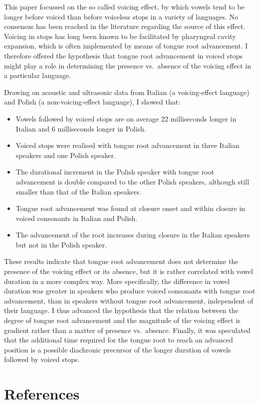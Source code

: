 \documentclass[authoryear, 5p]{elsarticle}
\providecommand{\tightlist}{%
  \setlength{\itemsep}{0pt}\setlength{\parskip}{0pt}}
\begin{document}
This paper focussed on the so called voicing effect, by which vowels
tend to be longer before voiced than before voiceless stops in a variety
of languages. No consensus has been reached in the literature regarding
the source of this effect. Voicing in stops has long been known to be
facilitated by pharyngeal cavity expansion, which is often implemented
by means of tongue root advancement. I therefore offered the hypothesis
that tongue root advancement in voiced stops might play a role in
determining the presence vs.~absence of the voicing effect in a
particular language.

Drawing on acoustic and ultrasonic data from Italian (a voicing-effect
language) and Polish (a non-voicing-effect language), I showed that:

\begin{itemize}
\tightlist
\item
  Vowels followed by voiced stops are on average 22 milliseconds longer
  in Italian and 6 milliseconds longer in Polish.
\item
  Voiced stops were realised with tongue root advancement in three
  Italian speakers and one Polish speaker.
\item
  The durational increment in the Polish speaker with tongue root
  advancement is double compared to the other Polish speakers, although
  still smaller than that of the Italian speakers.
\item
  Tongue root advancement was found at closure onset and within closure
  in voiced consonants in Italian and Polish.
\item
  The advancement of the root increases during closure in the Italian
  speakers but not in the Polish speaker.
\end{itemize}

These results indicate that tongue root advancement does not determine
the presence of the voicing effect or its absence, but it is rather
correlated with vowel duration in a more complex way. More specifically,
the difference in vowel duration was greater in speakers who produce
voiced consonants with tongue root advancement, than in speakers without
tongue root advancement, independent of their language. I thus advanced
the hypothesis that the relation between the degree of tongue root
advancement and the magnitude of the voicing effect is gradient rather
than a matter of presence vs.~absence. Finally, it was speculated that
the additional time required for the tongue root to reach an advanced
position is a possible diachronic precursor of the longer duration of
vowels followed by voiced stops.

\section*{References}



\end{document}
